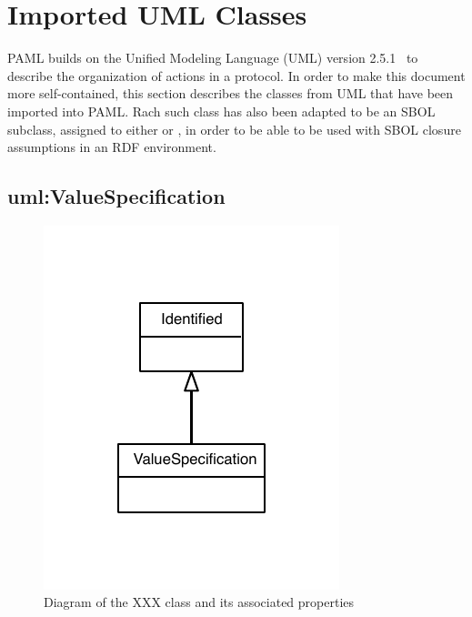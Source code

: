 \section{Imported UML Classes}

PAML builds on the Unified Modeling Language (UML) version 2.5.1~\citep{uml251} to describe the organization of actions in a protocol.
In order to make this document more self-contained, this section describes the classes from UML that have been imported into PAML.
Rach such class has also been adapted to be an SBOL subclass, assigned to either  or , in order to be able to be used with SBOL closure assumptions in an RDF environment.

\subsection{uml:ValueSpecification}
\label{sec:uml:ValueSpecification}

\begin{figure}[ht]
\begin{center}
\includegraphics[scale=0.6]{uml_classes/ValueSpecification_abstraction_hierarchy.pdf}
\caption[]{Diagram of the XXX class and its associated properties}
\label{uml:ValueSpecification}
\end{center}
\end{figure}

